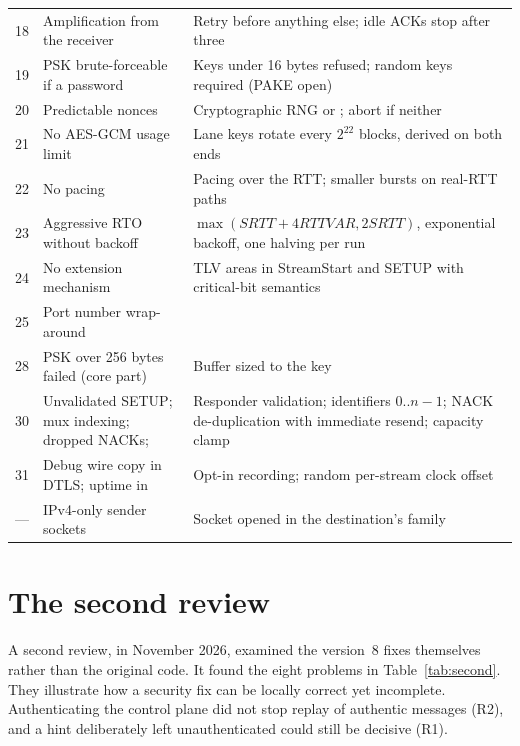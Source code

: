 \begin{xltabular}{\linewidth}{c>{\raggedright\arraybackslash}p{4.6cm}>{\raggedright\arraybackslash}X}
18 & Amplification from the receiver & Retry before anything else; idle ACKs stop after three \\
19 & PSK brute-forceable if a password & Keys under 16 bytes refused; random keys required (PAKE open) \\
20 & Predictable nonces & Cryptographic RNG or ; abort if neither \\
21 & No AES-GCM usage limit & Lane keys rotate every $2^{22}$ blocks, derived on both ends \\
22 & No pacing & Pacing over the RTT; smaller bursts on real-RTT paths \\
23 & Aggressive RTO without backoff & $\max(\mathit{SRTT}+4\mathit{RTTVAR},2\mathit{SRTT})$, exponential backoff, one halving per run \\
24 & No extension mechanism & TLV areas in StreamStart and SETUP with critical-bit semantics \\
25 & Port number wrap-around &  \\
28 & PSK over 256 bytes failed (core part) & Buffer sized to the key \\
30 & Unvalidated SETUP; mux indexing; dropped NACKs;  & Responder validation; identifiers $0..n-1$; NACK de-duplication with immediate resend; capacity clamp \\
31 & Debug wire copy in DTLS; uptime in  & Opt-in recording; random per-stream clock offset \\
--- & IPv4-only sender sockets & Socket opened in the destination's family \\
\end{xltabular}
\endgroup

\section{The second review}\label{sec:second}

A second review, in November 2026, examined the version~8 fixes themselves rather than the original code. It
found the eight problems in Table~\ref{tab:second}. They illustrate how a security fix can be locally correct
yet incomplete. Authenticating the control plane did not stop replay of authentic messages (R2), and a hint
deliberately left unauthenticated could still be decisive (R1).

